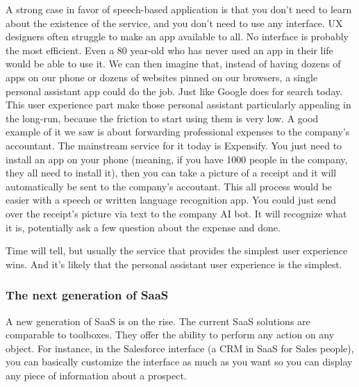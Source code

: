 \documentclass[12pt]{article}
\begin{document}
A strong case in favor of speech-based application is that you don't need to
learn about the existence of the service, and you don't need to use any
interface. UX designers often struggle to make an app available to all. No
interface is probably the most efficient. Even a 80 year-old who has never used
an app in their life would be able to use it. We can then imagine that, instead
of having dozens of apps on our phone or dozens of websites pinned on our
browsers, a single personal assistant app could do the job. Just like Google
does for search today. This user experience part make those personal assistant
particularly appealing in the long-run, because the friction to start using them
is very low. A good example of it we saw is about forwarding professional
expenses to the company's accountant. The mainstream service for it today is
Expensify. You just need to install an app on your phone (meaning, if you have
1000 people in the company, they all need to install it), then you can take a
picture of a receipt and it will automatically be sent to the company's
accoutant. This all process would be easier with a speech or written language
recognition app. You could just send over the receipt's picture via text to the
company AI bot. It will recognize what it is, potentially ask a few question
about the expense and done.

Time will tell, but usually the service that provides the simplest user
experience wins. And it's likely that the personal assistant user experience is
the simplest.


\subsubsection{The next generation of SaaS}

A new generation of SaaS is on the rise. The current SaaS solutions are
comparable to toolboxes. They offer the ability to perform any action on any
object. For instance, in the Salesforce interface (a CRM in SaaS for Sales
people), you can basically customize the interface as much as you want so you
can display any piece of information about a prospect.


\smallskip
\end{document}
